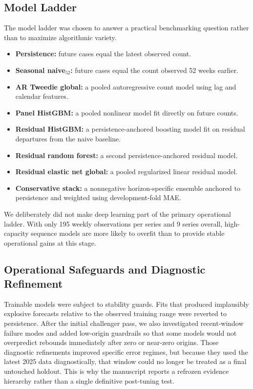 \documentclass[11pt]{article}
\begin{document}
\subsection{Model Ladder}
The model ladder was chosen to answer a practical benchmarking question rather than to maximize algorithmic variety.
\begin{itemize}
    \item \textbf{Persistence:} future cases equal the latest observed count.
    \item \textbf{Seasonal naive$_{52}$:} future cases equal the count observed 52 weeks earlier.
    \item \textbf{AR Tweedie global:} a pooled autoregressive count model using lag and calendar features.
    \item \textbf{Panel HistGBM:} a pooled nonlinear model fit directly on future counts.
    \item \textbf{Residual HistGBM:} a persistence-anchored boosting model fit on residual departures from the naive baseline.
    \item \textbf{Residual random forest:} a second persistence-anchored residual model.
    \item \textbf{Residual elastic net global:} a pooled regularized linear residual model.
    \item \textbf{Conservative stack:} a nonnegative horizon-specific ensemble anchored to persistence and weighted using development-fold MAE.
\end{itemize}

We deliberately did not make deep learning part of the primary operational ladder. With only 195 weekly observations per series and 9 series overall, high-capacity sequence models are more likely to overfit than to provide stable operational gains at this stage.

\subsection{Operational Safeguards and Diagnostic Refinement}
Trainable models were subject to stability guards. Fits that produced implausibly explosive forecasts relative to the observed training range were reverted to persistence. After the initial challenger pass, we also investigated recent-window failure modes and added low-origin guardrails so that some models would not overpredict rebounds immediately after zero or near-zero origins. Those diagnostic refinements improved specific error regimes, but because they used the latest 2025 data diagnostically, that window could no longer be treated as a final untouched holdout. This is why the manuscript reports a refrozen evidence hierarchy rather than a single definitive post-tuning test.
\end{document}
